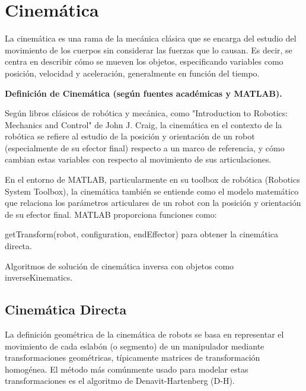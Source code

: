 \section{Cinemática} \label{sec:cinematica}

La cinemática es una rama de la mecánica clásica que se encarga del estudio del movimiento de los cuerpos sin considerar las fuerzas que lo causan. Es decir, se centra en describir cómo se mueven los objetos, especificando variables como posición, velocidad y aceleración, generalmente en función del tiempo.

\textbf{Definición de Cinemática (según fuentes académicas y MATLAB).}


Según libros clásicos de robótica y mecánica, como "Introduction to Robotics: Mechanics and Control" de John J. Craig, la cinemática en el contexto de la robótica se refiere al estudio de la posición y orientación de un robot (especialmente de su efector final) respecto a un marco de referencia, y cómo cambian estas variables con respecto al movimiento de sus articulaciones.

En el entorno de MATLAB, particularmente en su toolbox de robótica (Robotics System Toolbox), la cinemática también se entiende como el modelo matemático que relaciona los parámetros articulares de un robot con la posición y orientación de su efector final. MATLAB proporciona funciones como:

getTransform(robot, configuration, endEffector) para obtener la cinemática directa.

Algoritmos de solución de cinemática inversa con objetos como inverseKinematics.

\subsection{Cinemática Directa}
La definición geométrica de la cinemática de robots se basa en representar el movimiento de cada eslabón (o segmento) de un manipulador mediante transformaciones geométricas, típicamente matrices de transformación homogénea. El método más comúnmente usado para modelar estas transformaciones es el algoritmo de Denavit-Hartenberg (D-H).


